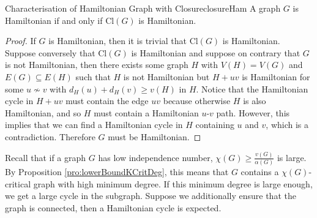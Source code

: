\documentclass[math, code]{amznotes}
\theoremstyle{remark}
\begin{document}
\begin{probox}{Characterisation of Hamiltonian Graph with Closure}{closureHam}
    A graph $G$ is Hamiltonian if and only if $\mathrm{Cl}(G)$ is Hamiltonian.
    \tcblower
    \begin{proof}
        If $G$ is Hamiltonian, then it is trivial that $\mathrm{Cl}(G)$ is Hamiltonian. Suppose conversely that $\mathrm{Cl}(G)$ is Hamiltonian and suppose on contrary that $G$ is not Hamiltonian, then there exists some graph $H$ with $V(H) = V(G)$ and $E(G) \subseteq E(H)$ such that $H$ is not Hamiltonian but $H + uv$ is Hamiltonian for some $u \not\sim v$ with $d_H(u) + d_H(v) \geq v(H)$ in $H$. Notice that the Hamiltonian cycle in $H + uv$ must contain the edge $uv$ because otherwise $H$ is also Hamiltonian, and so $H$ must contain a Hamiltonian $u$-$v$ path. However, this implies that we can find a Hamiltonian cycle in $H$ containing $u$ and $v$, which is a contradiction. Therefore $G$ must be Hamiltonian.
    \end{proof}
\end{probox}
Recall that if a graph $G$ has low independence number, $\chi(G) \geq \frac{v(G)}{\alpha(G)}$ is large. By Proposition \ref{pro:lowerBoundKCritDeg}, this means that $G$ contains a $\chi(G)$-critical graph with high minimum degree. If this minimum degree is large enough, we get a large cycle in the subgraph. Suppose we additionally ensure that the graph is connected, then a Hamiltonian cycle is expected.
\end{document}
